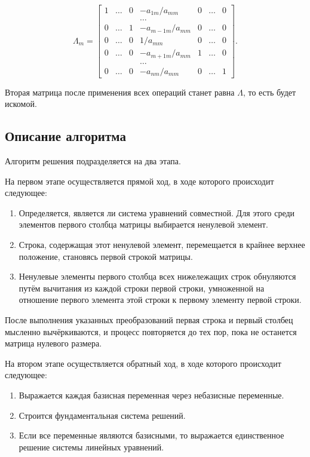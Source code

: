 \begin{equation}
    \label{eq:eq_a11}
    \Lambda _{m}={\begin{bmatrix}
                      1& \dots & 0& -a_{1m}/a_{mm}& 0& \dots & 0\\& & & \dots & & & \\0& \dots & 1& -a_{m-1m}/a_{mm}& 0& \dots & 0\\0& \dots & 0& 1/a_{mm}& 0& \dots & 0\\0& \dots & 0& -a_{m+1m}/a_{mm}& 1& \dots & 0\\& & & \dots & & & \\0& \dots & 0& -a_{nm}/a_{mm}& 0& \dots & 1
    \end{bmatrix}}.
\end{equation}

Вторая матрица после применения всех операций станет равна $\Lambda$, то есть будет искомой.



\subsection*{Описание алгоритма}

Алгоритм решения подразделяется на два этапа.


На первом этапе осуществляется прямой ход, в ходе которого происходит следующее:


\begin{enumerate}
    \item Определяется, является ли система уравнений совместной. Для этого среди элементов первого столбца матрицы выбирается ненулевой элемент.
    \item Строка, содержащая этот ненулевой элемент, перемещается в крайнее верхнее положение, становясь первой строкой матрицы.
    \item Ненулевые элементы первого столбца всех нижележащих строк обнуляются путём вычитания из каждой строки первой строки, умноженной на отношение первого элемента этой строки к первому элементу первой строки.
\end{enumerate}

После выполнения указанных преобразований первая строка и первый столбец мысленно вычёркиваются, и процесс повторяется до тех пор, пока не останется матрица нулевого размера.


На втором этапе осуществляется обратный ход, в ходе которого происходит следующее:


\begin{enumerate}
    \item Выражается каждая базисная переменная через небазисные переменные.
    \item Строится фундаментальная система решений.
    \item Если все переменные являются базисными, то выражается единственное решение системы линейных уравнений.
\end{enumerate}

